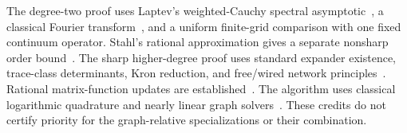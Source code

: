 \documentclass[11pt]{article}
\begin{document}
The degree-two proof uses Laptev's weighted-Cauchy spectral
asymptotic~\cite{Laptev}, a classical Fourier transform~\cite{DLMF},
and a uniform finite-grid comparison with one fixed continuum operator.
Stahl's rational approximation gives a separate nonsharp order
bound~\cite{Stahl}. The sharp higher-degree proof uses standard expander existence,
trace-class determinants, Kron reduction, and free/wired network
principles~\cite{Bordenave,Alon,Bornemann,GZ,DorflerBullo,LyonsPeres}. Rational
matrix-function updates are established~\cite{BCKS,SDA}. The algorithm
uses classical logarithmic quadrature and nearly linear graph
solvers~\cite{TW,KOSZ,KMP}. These credits do not certify priority for
the graph-relative specializations or their combination.








\appendix



\end{document}
